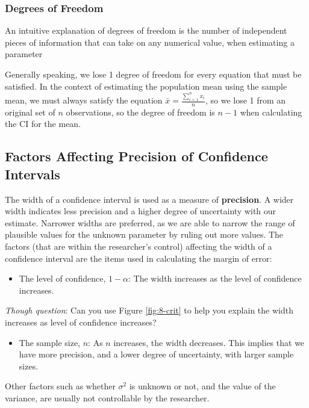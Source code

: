 \documentclass[
]{book}
\providecommand{\tightlist}{%
  \setlength{\itemsep}{0pt}\setlength{\parskip}{0pt}}
\begin{document}
\subsubsection{Degrees of Freedom}\label{degrees-of-freedom}

An intuitive explanation of degrees of freedom is the number of independent pieces of information that can take on any numerical value, when estimating a parameter

Generally speaking, we lose 1 degree of freedom for every equation that must be satisfied. In the context of estimating the population mean using the sample mean, we must always satisfy the equation \(\bar{x} = \frac{\sum_{i=1}^n x_i}{n}\), so we lose 1 from an original set of \(n\) observations, so the degree of freedom is \(n-1\) when calculating the CI for the mean.

\subsection{Factors Affecting Precision of Confidence Intervals}\label{factors-affecting-precision-of-confidence-intervals}

The width of a confidence interval is used as a measure of \textbf{precision}. A wider width indicates less precision and a higher degree of uncertainty with our estimate. Narrower widths are preferred, as we are able to narrow the range of plausible values for the unknown parameter by ruling out more values. The factors (that are within the researcher's control) affecting the width of a confidence interval are the items used in calculating the margin of error:

\begin{itemize}
\tightlist
\item
  The level of confidence, \(1 - \alpha\): The width increases as the level of confidence increases.
\end{itemize}

\emph{Though question}: Can you use Figure \ref{fig:8-crit} to help you explain the width increases as level of confidence increases?

\begin{itemize}
\tightlist
\item
  The sample size, \(n\): As \(n\) increases, the width decreases. This implies that we have more precision, and a lower degree of uncertainty, with larger sample sizes.
\end{itemize}

Other factors such as whether \(\sigma^2\) is unknown or not, and the value of the variance, are usually not controllable by the researcher.
\end{document}
